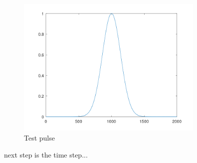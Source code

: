 \documentclass[12pt, letterpaper]{article}
\begin{document}
\begin{figure}[h]
	\centering
	\includegraphics[width=0.8\textwidth]{gaussian_pulse.png} %
	\caption{Test pulse}
	\label{fig:example}
\end{figure}

next step is the time step...
\end{document}
